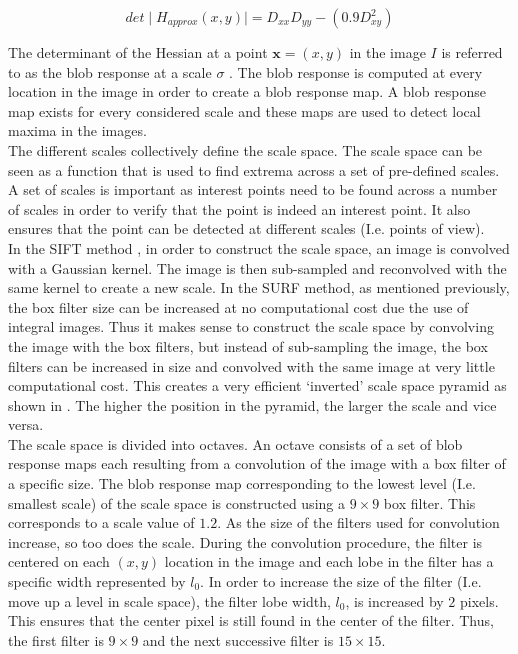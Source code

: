 \documentclass{article}
\begin{document}
\begin{equation}
det \mid H_{approx} (x,y) \mid = D_{xx}D_{yy} - (0.9 D_{xy}^2)
\label{eqn:approxHessian}
\end{equation}

The determinant of the Hessian at a point $\textbf{x} = (x,y)$ in the image $I$ is referred to as the blob response at a scale $\sigma$ \cite{Bay2008}. The blob response is computed at every location in the image in order to create a blob response map. A blob response map exists for every considered scale and these maps are used to detect local maxima in the images.\\

The different scales collectively define the scale space. The scale space can be seen as a function that is used to find extrema across a set of pre-defined scales. A set of scales is important as interest points need to be found across a number of scales in order to verify that the point is indeed an interest point. It also ensures that the point can be detected at different scales (I.e. points of view).\\

In the SIFT method \cite{Lowe2004}, in order to construct the scale space, an image is convolved with a Gaussian kernel. The image is then sub-sampled and reconvolved with the same kernel to create a new scale. In the SURF method, as mentioned previously, the box filter size can be increased at no computational cost due the use of integral images. Thus it makes sense to construct the scale space by convolving the image with the box filters, but instead of sub-sampling the image, the box filters can be increased in size and convolved with the same image at very little computational cost. This creates a very efficient `inverted' scale space pyramid as shown in . The higher the position in the pyramid, the larger the scale and vice versa. \\

The scale space is divided into octaves. An octave consists of a set of blob response maps each resulting from a convolution of the image with a box filter of a specific size. The blob response map corresponding to the lowest level (I.e. smallest scale) of the scale space is constructed using a $9 \times 9$ box filter. This corresponds to a scale value of $1.2$. As the size of the filters used for convolution increase, so too does the scale. During the convolution procedure, the filter is centered on each $(x,y)$ location in the image and each lobe in the filter has a specific width represented by $l_0$. In order to increase the size of the filter (I.e. move up a level in scale space), the filter lobe width, $l_0$, is increased by $2$ pixels. This ensures that the center pixel is still found in the center of the filter. Thus, the first filter is $9 \times 9$ and the next successive filter is $15 \times 15$. \\
\end{document}
